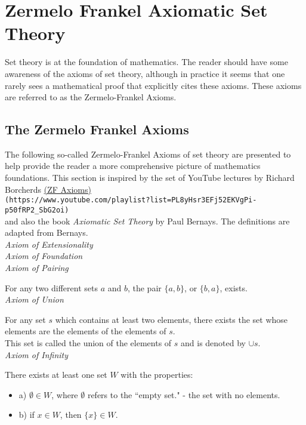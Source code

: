 \section{Zermelo Frankel Axiomatic Set Theory}

Set theory is at the foundation of mathematics.  The reader should have some awareness of the axioms of set theory, although in practice it seems that one rarely sees a mathematical proof that explicitly cites these axioms.  These axioms are referred to as the Zermelo-Frankel Axioms.

\subsection{The Zermelo Frankel Axioms}

The following so-called Zermelo-Frankel Axioms of set theory are presented to help provide the reader a more comprehensive picture of mathematics foundations.  This section is inspired by the set of YouTube lectures by Richard Borcherds \href{https://www.youtube.com/playlist?list=PL8yHsr3EFj52EKVgPi-p50fRP2_SbG2oi}{(ZF Axioms)}\\
\verb+(https://www.youtube.com/playlist?list=PL8yHsr3EFj52EKVgPi-p50fRP2_SbG2oi)+\\ and also the book \textit{Axiomatic Set Theory} by Paul Bernays.  The definitions are adapted from Bernays.\\

\textit{Axiom of Extensionality}\\

\textit{Axiom of Foundation}\\

\textit{Axiom of Pairing}

For any two different sets $a$ and $b$, the pair $\{a,b\}$, or $\{b,a\}$, exists.\\

\textit{Axiom of Union}

For any set $s$ which contains at least two elements, there exists the set whose elements are the elements of the elements of $s.$ \\ 

This set is called the union of the elements of $s$ and is denoted by $\cup s.$  \\

\textit{Axiom of Infinity}

There exists at least one set $W$ with the properties:

\begin{itemize}
\item a) $\emptyset \in W$, where $\emptyset$ refers to the ``empty set." - the set with no elements.
\item b) if $x \in W$, then $\{x\} \in W.$
\end{itemize}

